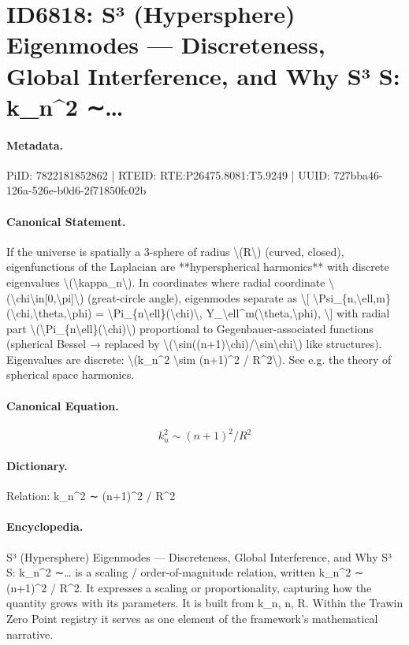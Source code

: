 \section*{ID6818: S³ (Hypersphere) Eigenmodes — Discreteness, Global Interference, and Why S³ S: k\_n\textasciicircum{}2 ∼…}
\paragraph{Metadata.}
PiID: 7822181852862 | RTEID: RTE:P26475.8081:T5.9249 | UUID: 727bba46-126a-526e-b0d6-2f71850fc02b

\paragraph{Canonical Statement.}
If the universe is spatially a 3-sphere of radius \textbackslash{}(R\textbackslash{}) (curved, closed), eigenfunctions of the Laplacian are **hyperspherical harmonics** with discrete eigenvalues \textbackslash{}(\textbackslash{}kappa\_n\textbackslash{}). In coordinates where radial coordinate \textbackslash{}(\textbackslash{}chi\textbackslash{}in[0,\textbackslash{}pi]\textbackslash{}) (great-circle angle), eigenmodes separate as \textbackslash{}[ \textbackslash{}Psi\_\{n,\textbackslash{}ell,m\}(\textbackslash{}chi,\textbackslash{}theta,\textbackslash{}phi) = \textbackslash{}Pi\_\{n\textbackslash{}ell\}(\textbackslash{}chi)\textbackslash{}, Y\_\textbackslash{}ell\textasciicircum{}m(\textbackslash{}theta,\textbackslash{}phi), \textbackslash{}] with radial part \textbackslash{}(\textbackslash{}Pi\_\{n\textbackslash{}ell\}(\textbackslash{}chi)\textbackslash{}) proportional to Gegenbauer-associated functions (spherical Bessel → replaced by \textbackslash{}(\textbackslash{}sin((n+1)\textbackslash{}chi)/\textbackslash{}sin\textbackslash{}chi\textbackslash{}) like structures). Eigenvalues are discrete: \textbackslash{}(k\_n\textasciicircum{}2 \textbackslash{}sim (n+1)\textasciicircum{}2 / R\textasciicircum{}2\textbackslash{}). See e.g. the theory of spherical space harmonics.

\paragraph{Canonical Equation.}
\[
k_n^2 \sim (n+1)^2 / R^2
\]

\paragraph{Dictionary.}
Relation: k\_n\textasciicircum{}2 ∼ (n+1)\textasciicircum{}2 / R\textasciicircum{}2

\paragraph{Encyclopedia.}
S³ (Hypersphere) Eigenmodes — Discreteness, Global Interference, and Why S³ S: k\_n\textasciicircum{}2 ∼… is a scaling / order-of-magnitude relation, written k\_n\textasciicircum{}2 ∼ (n+1)\textasciicircum{}2 / R\textasciicircum{}2. It expresses a scaling or proportionality, capturing how the quantity grows with its parameters. It is built from k\_n, n, R. Within the Trawin Zero Point registry it serves as one element of the framework's mathematical narrative.
